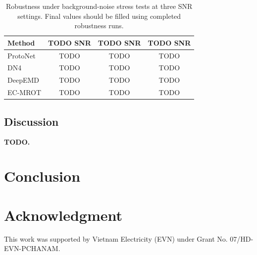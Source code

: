 \documentclass[journal]{IEEEtran}
\newcommand{\method}{EC-MROT}
\newcommand{\1}{\mathbf{1}}
\begin{document}
\begin{table}[t]
\centering
\caption{Robustness under background-noise stress tests at three SNR settings. Final values should be filled using completed robustness runs.}
\label{tab:noise_robustness}
\renewcommand{\arraystretch}{1.1}
\setlength{\tabcolsep}{0pt}
\begin{tabular*}{\columnwidth}{@{\extracolsep{\fill}}lccc@{}}
\toprule
Method & TODO SNR & TODO SNR & TODO SNR \\
\midrule
ProtoNet & TODO & TODO & TODO \\
DN4 & TODO & TODO & TODO \\
DeepEMD & TODO & TODO & TODO \\
\method{} & TODO & TODO & TODO \\
\bottomrule
\end{tabular*}
\end{table}

\subsection{Discussion}

\textbf{TODO.}


\section{Conclusion}
\label{sec:conclusion}

\section*{Acknowledgment}
This work was supported by Vietnam Electricity (EVN) under Grant No. 07/HD-EVN-PCHANAM.

\clearpage

\end{document}
